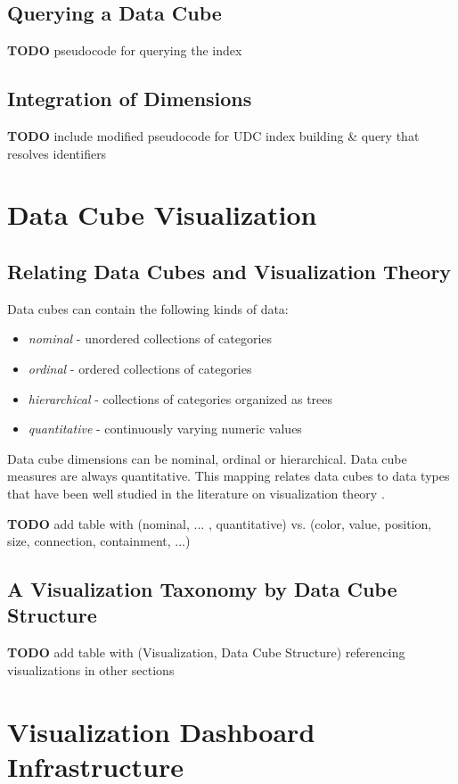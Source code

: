 \documentclass[12pt]{article}
\newcommand{\TODO}[1]{{ \color{red}\textbf{TODO} #1 }}
\begin{document}
\begin{doublespace}
\subsection{Querying a Data Cube}
\TODO{ pseudocode for querying the index}
\subsection{Integration of Dimensions}
\TODO{ include modified pseudocode for UDC index building \& query that resolves identifiers}

\pagebreak
\section{Data Cube Visualization} \label{dataCubeVisualization}
\subsection{Relating Data Cubes and Visualization Theory}
Data cubes can contain the following kinds of data:
\begin{itemize}
\item \emph{nominal} - unordered collections of categories
\item \emph{ordinal} - ordered collections of categories
\item \emph{hierarchical} - collections of categories organized as trees
\item \emph{quantitative} - continuously varying numeric values
\end{itemize}
Data cube dimensions can be nominal, ordinal or hierarchical. Data cube measures are always quantitative. This mapping relates data cubes to data types that have been well studied in the literature on visualization theory \cite{bertin1983semiology, mackinlay1986automating, graham2010survey}.


\TODO{ add table with (nominal, ... , quantitative) vs. (color, value, position, size, connection, containment, ...)}
\subsection{A Visualization Taxonomy by Data Cube Structure}
\TODO{ add table with (Visualization, Data Cube Structure) referencing visualizations in other sections}

\pagebreak
\section{Visualization Dashboard Infrastructure}

\end{doublespace}
\end{document}
